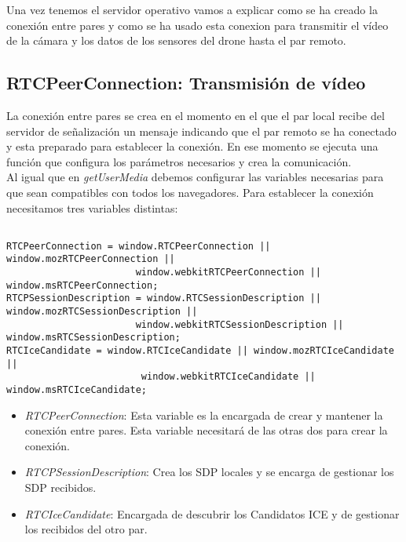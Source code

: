 Una vez tenemos el servidor operativo vamos a explicar como se ha creado la conexión entre pares y como se ha usado esta conexion para transmitir el vídeo de la cámara y los datos de los sensores del drone hasta el par remoto.\\

\subsection{RTCPeerConnection: Transmisión de vídeo}\label{subsec:transmisionvideo}

La conexión entre pares se crea en el momento en el que el par local recibe del servidor de señalización un mensaje indicando que el par remoto se ha conectado y esta preparado para establecer la conexión. En ese momento se ejecuta una función que configura los parámetros necesarios y  crea la comunicación.\\

Al igual que en \emph{getUserMedia} debemos configurar las variables necesarias para que sean compatibles con todos los navegadores. Para establecer la conexión necesitamos tres variables distintas:\\


\begin{lstlisting}[caption=Variables WebRTC]

RTCPeerConnection = window.RTCPeerConnection || window.mozRTCPeerConnection || 
                       window.webkitRTCPeerConnection || window.msRTCPeerConnection;
RTCPSessionDescription = window.RTCSessionDescription || window.mozRTCSessionDescription ||
                       window.webkitRTCSessionDescription || window.msRTCSessionDescription;
RTCIceCandidate = window.RTCIceCandidate || window.mozRTCIceCandidate ||
                        window.webkitRTCIceCandidate || window.msRTCIceCandidate;

\end{lstlisting}

\begin{itemize}

\item \emph{RTCPeerConnection}: Esta variable es la encargada de crear y mantener la conexión entre pares. Esta variable necesitará de las otras dos para crear la conexión.
\item \emph{RTCPSessionDescription}: Crea los SDP locales y se encarga de gestionar los SDP recibidos.
\item \emph{RTCIceCandidate}: Encargada de descubrir los Candidatos ICE y de gestionar los recibidos del otro par.

\end{itemize}


